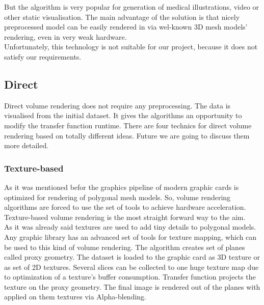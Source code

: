 \documentclass[twoside, english, 11pt]{report}
\begin{document}
But the algorithm is very popular for generation of medical illustrations, video or other static visualisation. The main advantage of the solution is that nicely preprocessed model can be easily rendered in via wel-known 3D mesh models' rendering, even in very weak hardware.\\

Unfortunately, this technology is not suitable for our project, because it does not satisfy our requirements.



\subsection{Direct}
Direct volume rendering does not require any preprocessing. The data is visualised from the initial dataset. It gives the algorithms an opportunity to modify the transfer function runtime. There are four technics for direct volume rendering based on totally different ideas. Future we are going to discuss them more detailed.
\subsubsection{Texture-based}

As it was mentioned befor the graphics pipeline of modern graphic cards is optimized for rendering of polygonal mesh models. So, volume rendering algorithms are forced to use the set of tools to achieve hardware acceleration. Texture-based volume rendering is the most straight forward way to the aim.\\

As it was already said textures are used to add tiny details to polygonal models. Any graphic library has an advanced set of tools for texture mapping, which can be used to this kind of volume rendering. The algorithm creates set of planes called proxy geometry. The dataset is loaded to the graphic card as 3D texture or as set of 2D textures. Several slices can be collected to one huge texture map due to optimization of  a texture's buffer consumption. Transfer function projects the texture on the proxy geometry. The final image is rendered out of the planes with applied on them textures via Alpha-blending.\\
\end{document}
